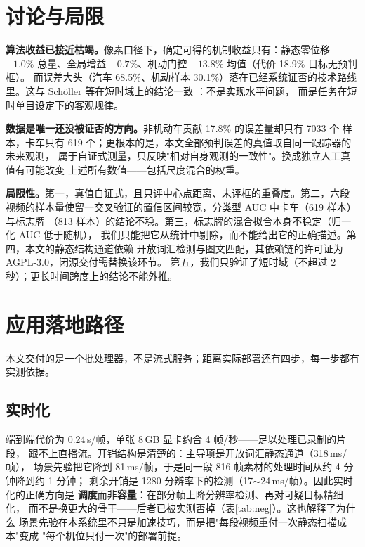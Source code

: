 \documentclass[11pt,a4paper]{ctexart}
\begin{document}
\section{讨论与局限}
\label{sec:discussion}

\textbf{算法收益已接近枯竭。}像素口径下，确定可得的机制收益只有：静态零位移
$-1.0\%$ 总量、全局增益 $-0.7\%$、机动门控 $-13.8\%$ 均值（代价 18.9\% 目标无预判框）。
而误差大头（汽车 68.5\%、机动样本 30.1\%）落在已经系统证否的技术路线里。这与
Sch\"oller 等在短时域上的结论一致 \citep{scholler2020cv}：不是实现水平问题，
而是任务在短时单目设定下的客观规律。

\textbf{数据是唯一还没被证否的方向。}非机动车贡献 17.8\% 的误差量却只有 7033 个
样本，卡车只有 619 个；更根本的是，本文全部预判误差的真值取自同一跟踪器的未来观测，
属于自证式测量，只反映"相对自身观测的一致性"。换成独立人工真值有可能改变
上述所有数值——包括尺度混合的权重。

\textbf{局限性。}第一，真值自证式，且只评中心点距离、未评框的重叠度。第二，六段
视频的样本量使留一交叉验证的置信区间较宽，分类型 AUC 中卡车（619 样本）与标志牌
（813 样本）的结论不稳。第三，标志牌的混合拟合本身不稳定（归一化 AUC 低于随机），
我们只能把它从统计中剔除，而不能给出它的正确描述。第四，本文的静态结构通道依赖
开放词汇检测与图文匹配，其依赖链的许可证为 AGPL-3.0，闭源交付需替换该环节。
第五，我们只验证了短时域（不超过 2 秒）；更长时间跨度上的结论不能外推。

\section{应用落地路径}
\label{sec:deploy}

本文交付的是一个批处理器，不是流式服务；距离实际部署还有四步，每一步都有实测依据。

\subsection{实时化}

端到端代价为 0.24\,s/帧，单张 8\,GB 显卡约合 4 帧/秒——足以处理已录制的片段，
跟不上直播流。开销结构是清楚的：主导项是开放词汇静态通道（318\,ms/帧），
场景先验把它降到 81\,ms/帧，于是同一段 816 帧素材的处理时间从约 4 分钟降到约 1 分钟；
剩余开销是 1280 分辨率下的检测（17$\sim$24\,ms/帧）。因此实时化的正确方向是
\textbf{调度}而非\textbf{容量}：在部分帧上降分辨率检测、再对可疑目标精细化，
而不是换更大的骨干——后者已被实测否掉（表\ref{tab:neg}）。这也解释了为什么
场景先验在本系统里不只是加速技巧，而是把"每段视频重付一次静态扫描成本"变成
"每个机位只付一次"的部署前提。
\end{document}
